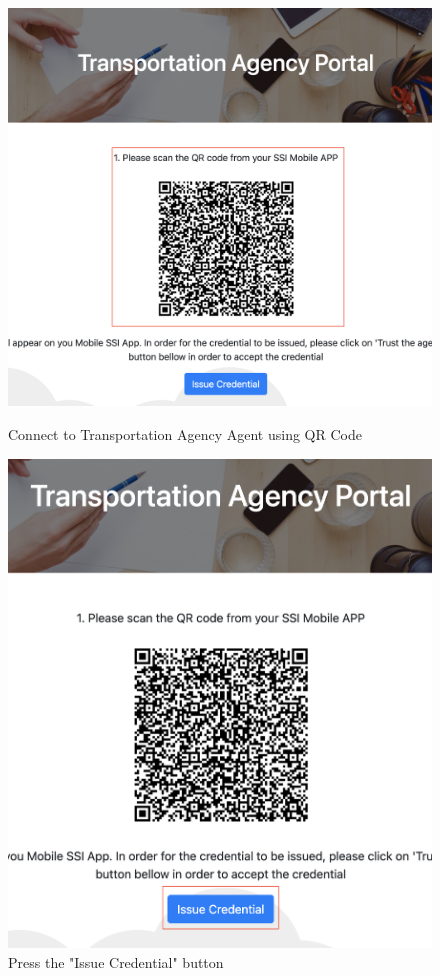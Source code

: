 \begin{figure}[H]
\centering
\begin{minipage}{.5\textwidth}
  \centering
  \includegraphics[width=.8\linewidth]{images/Frontend/Transportation_agency/Screenshot2.png}
  \caption[]{Connect to Transportation Agency Agent using QR Code}
  \label{fig:ev_owner_screenshot_2}
\end{minipage}%
\begin{minipage}{.5\textwidth}
  \centering
  \includegraphics[width=.8\linewidth]{images/Frontend/Transportation_agency/Screenshot3.png}
  \caption[]{Press the "Issue Credential" button}
  \label{fig:ev_owner_screenshot_3}
\end{minipage}
\end{figure}

